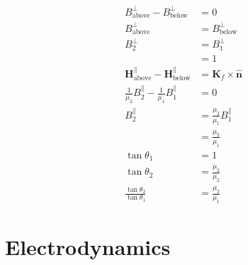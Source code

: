 \documentclass{article}
\renewcommand{\vec}[1]{\boldsymbol{\mathbf{#1}}}
\newcommand{\uvec}[1]{\hat{\vec{#1}}}
\begin{document}
\begin{align*}
  B_\text{above}^\perp - B_\text{below}^\perp                     & = 0                                 \\
  B_\text{above}^\perp                                            & = B_\text{below}^\perp              \\
  B_2^\perp                                                       & = B_1^\perp                         \\
                                                                  & = 1                                 \\
  \vec{H}_\text{above}^\parallel - \vec{H}_\text{below}^\parallel & = \vec{K}_f \times \uvec{n}         \\
  \frac{1}{\mu_2} B_2^\parallel - \frac{1}{\mu_1} B_1^\parallel   & = 0                                 \\
  B_2^\parallel                                                   & = \frac{\mu_2}{\mu_1} B_1^\parallel \\
                                                                  & = \frac{\mu_2}{\mu_1}               \\
  \tan \theta_1                                                   & = 1                                 \\
  \tan \theta_2                                                   & = \frac{\mu_2}{\mu_2}               \\
  \frac{\tan \theta_2}{\tan \theta_1}                             & = \frac{\mu_2}{\mu_1}
\end{align*}

\section{Electrodynamics}

\subsection{}
\end{document}
